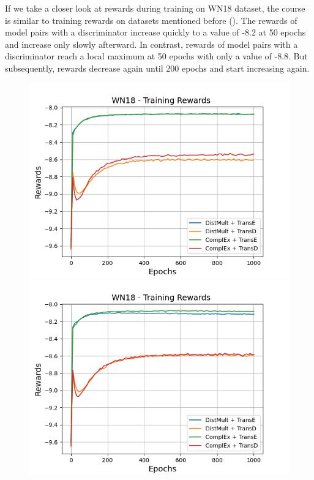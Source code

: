 If we take a closer look at rewards during training on \textsc{WN18} dataset, the course is similar to training rewards on datasets mentioned before ().
The rewards of model pairs with a \transe discriminator increase quickly to a value of -8.2 at 50 epochs and increase only slowly afterward.
In contrast, rewards of model pairs with a \transd discriminator reach a local maximum at 50 epochs with only a value of -8.8.
But subsequently, rewards decrease again until 200 epochs and start increasing again.
\clearpage
\begin{figure}[H]
    \centering
    \begin{minipage}{.5\textwidth}
      \centering
      \includegraphics[width=0.9\linewidth]{figures/results/gan_train/not_pretrained/uncertainty/max_distribution/entropy/wn18/1k_epochs/uncertainty_wn18_rew.png}
    \end{minipage}%
    \begin{minipage}{.5\textwidth}
      \centering
      \includegraphics[width=0.9\linewidth]{figures/results/gan_train/not_pretrained/uncertainty/max_distribution/least_confidence/wn18/uncertainty_wn18_rew.png}

\end{minipage}
\end{figure}
